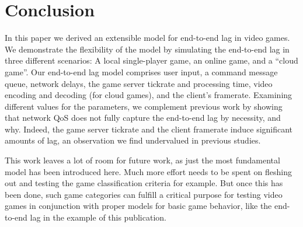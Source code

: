 \section{Conclusion}
\label{sec:conclusion}


In this paper we derived an extensible model for end-to-end lag in video games. We demonstrate the flexibility of the model by simulating the end-to-end lag in three different scenarios: A local single-player game, an online game, and a ``cloud game''. 
Our end-to-end lag model comprises user input, a command message queue, network delays, the game server tickrate and processing time, video encoding and decoding (for cloud games), and the client's framerate. Examining different values for the parameters, we complement previous work by showing that network \acrfull{QoS} does not fully capture the end-to-end lag by necessity, and why. Indeed, the game server tickrate and the client framerate induce significant amounts of lag, an observation we find undervalued in previous studies.



This work leaves a lot of room for future work, as just the most fundamental model has been introduced here. Much more effort needs to be spent on fleshing out and testing the game classification criteria for example. But once this has been done, such game categories can fulfill a critical purpose for testing video games in conjunction with proper models for basic game behavior, like the end-to-end lag in the example of this publication.
